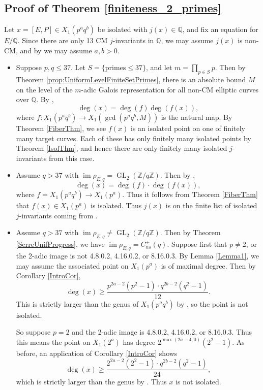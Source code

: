 \documentclass{amsart}
\theoremstyle{definition}
\newcommand{\Q}{\mathbb{Q}}
\newcommand{\Z}{\mathbb{Z}}
\newcommand{\GL}{\operatorname{GL}}
\DeclareMathOperator{\im}{im}
\begin{document}
\subsection{Proof of Theorem \ref{finiteness_2_primes}} \label{Finiteness_proof}
    Let $x=[E,P] \in X_1(p^aq^b)$ be isolated with $j(x) \in \Q$, and fix an equation for $E/\Q$. Since there are only 13 CM $j$-invariants in $\Q$, we may assume $j(x)$ is non-CM, and by \cite{BourdonEjder} we may assume $a,b>0$. 
    \begin{itemize}
        \item Suppose $p,q\leq 37$. Let $S=\{ \text{primes} \leq 37\}$, and let $m = \prod_{p \in S} p$. Then by Theorem \ref{prop:UniformLevelFiniteSetPrimes}, there is an absolute bound $M$ on the level of the $m$-adic Galois representation for all non-CM elliptic curves over $\Q$. By \cite[Proposition 5.8]{BELOV}, 
        \[
        \deg(x)=\deg(f)\deg(f(x)),
        \]
        where $f:X_1(p^aq^b)\rightarrow X_1(\gcd(p^aq^b,M))$ is the natural map. By Theorem \ref{FiberThm}, we see $f(x)$ is an isolated point on one of finitely many target curves. Each of these has only finitely many isolated points by Theorem \ref{IsolThm}, and hence there are only finitely many isolated $j$-invariants from this case.
        \item Assume $q> 37$ with $\im \rho_{E,q}=\GL_2(\Z/q\Z)$. Then by \cite[Proposition 5.7]{BELOV}, 
        \[
        \deg(x)=\deg(f) \cdot \deg(f(x)),
        \]
        where $f=X_1(p^aq^b) \rightarrow X_1(p^a)$. Thus it follows from Theorem \ref{FiberThm} that $f(x) \in X_1(p^a)$ is isolated. Thus $j(x)$ is on the finite list of isolated $j$-invariants coming from \cite{BourdonEjder}.
        \item Assume $q>37$ with $\im \rho_{E,q}\neq\GL_2(\Z/q\Z)$. Then by Theorem \ref{SerreUnifProgress}, we have  $\im \rho_{E,q}=C_{ns}^+(q)$. Suppose first that $p \neq 2$, or the 2-adic image is not 4.8.0.2, 4.16.0.2, or 8.16.0.3. By Lemma \ref{Lemma1}, we may assume the associated point on $X_1(p^a)$ is of maximal degree. Then by Corollary \ref{IntroCor},
\[
       \deg(x) \geq \frac{p^{2a-2}(p^2-1)\cdot q^{2b-2}(q^2-1)}{12}.
        \]
        This is strictly larger than the genus of $X_1(p^aq^b)$ by  \cite[Proposition 1.40]{Shimura71}, so the point is not isolated. 

        So suppose $p=2$ and the 2-adic image is 4.8.0.2, 4.16.0.2, or 8.16.0.3. Thus this means the point on $X_1(2^a)$ has degree $2^{\max(2a-4,0)}(2^2-1)$.
        As before, an application of Corollary \ref{IntroCor} shows 
\[
        \deg(x) \geq \frac{2^{2a-2}(2^2-1)\cdot q^{2b-2}(q^2-1)}{24},
        \]
        which is strictly larger than the genus by \cite[Proposition 1.40]{Shimura71}. Thus $x$ is not isolated.  
    \end{itemize}
\end{document}

